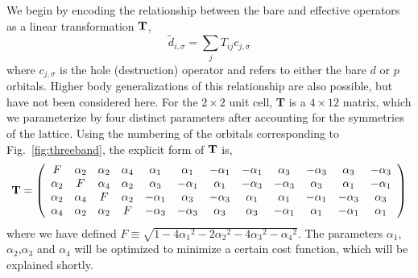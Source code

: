 We begin by encoding the relationship between the bare and effective operators as a linear transformation ${\bf T}$, 
\begin{equation}
	\tilde{d}_{i,\sigma} = \sum_{j} T_{ij} c_{j,\sigma}
\label{eq:dc}
\end{equation}
where $c_{j,\sigma}$ is the hole (destruction) operator and refers to either the bare $d$ or $p$ orbitals. 
Higher body generalizations of this relationship are also possible, but have not been considered here. 
For the $2\times2$ unit cell, {\bf T} is a $4 \times 12 $ matrix, which we parameterize by four distinct 
parameters after accounting for the symmetries of the lattice. 
Using the numbering of the orbitals corresponding to Fig.~\ref{fig:threeband}, the explicit form of ${\bf T}$ is,
\begin{eqnarray}
{\bf T} = 
\left(
\begin{array}{cccccccccccc}
F        & \alpha_2 &        \alpha_2 &  \alpha_4 & \alpha_1 & \alpha_1 & -\alpha_1 & -\alpha_1 & \alpha_3 & -\alpha_3 & \alpha_3 & -\alpha_3 \\
\alpha_2 &  F       &        \alpha_4 &  \alpha_2 & \alpha_3 & -\alpha_1 & \alpha_1 & -\alpha_3 & -\alpha_3 & \alpha_3 & \alpha_1 & -\alpha_1 \\
\alpha_2 & \alpha_4 & F               &  \alpha_2 & -\alpha_1 & \alpha_3 & -\alpha_3 & \alpha_1 & \alpha_1 & -\alpha_1 & -\alpha_3 & \alpha_3 \\
\alpha_4 & \alpha_2 & \alpha_2        &   F       & -\alpha_3 & -\alpha_3 & \alpha_3 & \alpha_3 & -\alpha_1 & \alpha_1 & -\alpha_1 & \alpha_1 \\
\end{array}
\right)
\end{eqnarray}
where we have defined $F \equiv \sqrt{1-4{\alpha_1}^2 - 2{\alpha_2}^2 - 4 {\alpha_3}^2 -{\alpha_4}^2}$. 
The parameters $\alpha_1$,$\alpha_2$,$\alpha_3$ and $\alpha_4$ will be optimized to minimize a certain cost function, 
which will be explained shortly. 

